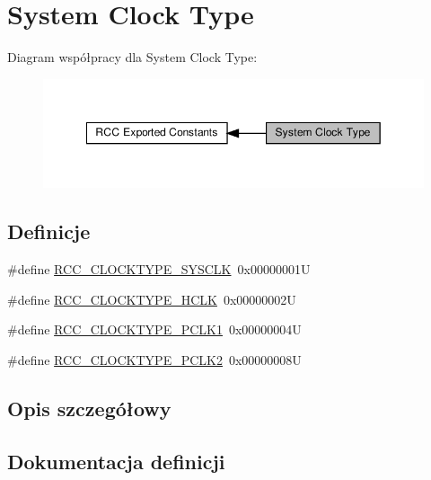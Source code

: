 \hypertarget{group___r_c_c___system___clock___type}{}\section{System Clock Type}
\label{group___r_c_c___system___clock___type}
Diagram współpracy dla System Clock Type\+:\nopagebreak
\begin{figure}[H]
\begin{center}
\leavevmode
\includegraphics[width=349pt]{group___r_c_c___system___clock___type}
\end{center}
\end{figure}
\subsection*{Definicje}
\begin{DoxyCompactItemize}
\item 
\#define \hyperlink{group___r_c_c___system___clock___type_ga7e721f5bf3fe925f78dae0356165332e}{R\+C\+C\+\_\+\+C\+L\+O\+C\+K\+T\+Y\+P\+E\+\_\+\+S\+Y\+S\+C\+LK}~0x00000001U
\item 
\#define \hyperlink{group___r_c_c___system___clock___type_gaa5330efbd790632856a2b15851517ef9}{R\+C\+C\+\_\+\+C\+L\+O\+C\+K\+T\+Y\+P\+E\+\_\+\+H\+C\+LK}~0x00000002U
\item 
\#define \hyperlink{group___r_c_c___system___clock___type_gab00c7b70f0770a616be4b5df45a454c4}{R\+C\+C\+\_\+\+C\+L\+O\+C\+K\+T\+Y\+P\+E\+\_\+\+P\+C\+L\+K1}~0x00000004U
\item 
\#define \hyperlink{group___r_c_c___system___clock___type_gaef7e78706e597a6551d71f5f9ad60cc0}{R\+C\+C\+\_\+\+C\+L\+O\+C\+K\+T\+Y\+P\+E\+\_\+\+P\+C\+L\+K2}~0x00000008U
\end{DoxyCompactItemize}


\subsection{Opis szczegółowy}


\subsection{Dokumentacja definicji}
\mbox{\label{group___r_c_c___system___clock___type_gaa5330efbd790632856a2b15851517ef9}} 

